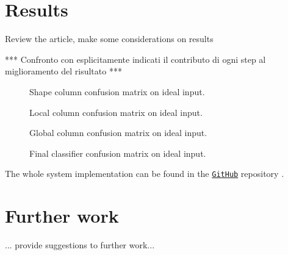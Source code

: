 \section{Results}\label{section:results}
    Review the article, make some considerations on results

    *** Confronto con esplicitamente indicati il contributo di ogni step al miglioramento del risultato ***

    \begin{figure}
        \centering
        \caption{Shape column confusion matrix on ideal input.}\label{fig:shape-confusion}
    \end{figure}

    \begin{figure}
        \centering
        \caption{Local column confusion matrix on ideal input.}\label{fig:local-confusion}
    \end{figure}

    \begin{figure}
        \centering
        \caption{Global column confusion matrix on ideal input.}\label{fig:global-confusion}
    \end{figure}

    \begin{figure}
        \centering
        \caption{Final classifier confusion matrix on ideal input.}\label{fig:final-classifier-confusion}
    \end{figure}

    The whole system implementation can be found in the \href{https://github.com/antonioterpin/wavelet_ml}{\texttt{GitHub}} repository \cite{antonioterpin:github}.


\section{Further work}\label{section:further-work}
    ...  provide suggestions to further work...